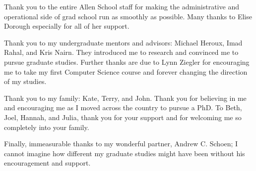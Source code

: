 Thank you to the entire Allen School staff for making the administrative and operational side of grad school run as smoothly as possible.
Many thanks to Elise Dorough especially for all of her support. 

Thank you to my undergraduate mentors and advisors: Michael Heroux, Imad Rahal, and Kris Nairn.
They introduced me to research and convinced me to pursue graduate studies.
Further thanks are due to Lynn Ziegler for encouraging me to take my first Computer Science course and forever changing the direction of my studies.

Thank you to my family: Kate, Terry, and John. 
Thank you for believing in me and encouraging me as I moved across the country to pursue a PhD.
To Beth, Joel, Hannah, and Julia, thank you for your support and for welcoming me so completely into your family.

Finally, immeasurable thanks to my wonderful partner, Andrew C. Schoen; 
I cannot imagine how different my graduate studies might have been without his encouragement and support.
\endgroup
